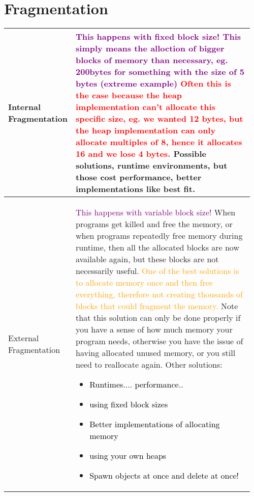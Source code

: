 \documentclass[main.tex,fontsize=8pt,paper=a4,paper=portrait,DIV=calc,]{scrartcl}
\begin{document}
\pagebreak 
\begin{table}[ht!]
\section{Fragmentation}
\begin{tabular}{|m{0.2\linewidth}|m{0.755\linewidth}|}
\hline
Internal Fragmentation & 
\textcolor{purple}{This happens with fixed block size!}\newline
\textcolor{purple}{This simply means the alloction of bigger blocks of memory than necessary, eg. 200bytes for something with the size of 5 bytes (extreme example)}\newline
\textcolor{red}{Often this is the case because the heap implementation can't allocate this specific size, eg. we wanted 12 bytes, but the heap implementation can only allocate multiples of 8, hence it allocates 16 and we lose 4 bytes.}\newline
Possible solutions, \textbf{runtime environments, but those cost performance}, better implementations like best fit.\\
\hline
External Fragmentation &
\textcolor{purple}{This happens with variable block size!}\newline
When programs get killed and free the memory, or when programs repeatedly free memory during runtime, then all the allocated blocks are now available again, but these blocks are not necessarily useful.\newline
\textcolor{orange}{One of the best solutions is to allocate memory once and then free everything, therefore not creating thousands of blocks that could fragment the memory.}\newline
Note that this solution can only be done properly if you have a sense of how much memory your program needs, otherwise you have the issue of having allocated unused memory, or you still need to reallocate again.\newline
Other solutions:\newline 
\begin{itemize}
\item \textcolor{black}{Runtimes.... performance..}
\item \textcolor{black}{using fixed block sizes}
\item \textcolor{black}{Better implementations of allocating memory}
\item \textcolor{black}{using your own heaps}
\item \textcolor{black}{Spawn objects at once and delete at once!}

\end{itemize}
\end{tabular}
\end{table}
\end{document}
